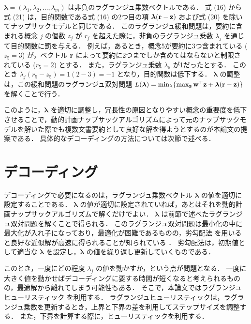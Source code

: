 \documentclass[japanese]{jnlp_1.4}
\begin{document}
$ \boldsymbol{\lambda} = (\lambda_{1}, \lambda_{2}, \ldots, \lambda_{m}) $ は非負のラグランジュ乗数ベクトルである．
式 (16) から式 (21) は，目的関数である式 (16) の2つ目の項 $\boldsymbol{\lambda}({\bf r} - {\bf z}) $ および式 (20) を除いてナップサックモデルと同じである．
このラグランジュ緩和問題は，要約に含まれる概念 $j$ の個数 $z_{j}$ が $r_{j}$ を超えた際に，非負のラグランジュ乗数 $ \lambda_{j} $ を通じて目的関数に罰を与える．
例えば，あるとき，概念5が要約に3つ含まれている ($z_{5} = 3$) が，ベクトル $ {\bf r} $ によって要約に2つまでしか含めてはならないと制限されている ($ r_{5} = 2 $) とする．
また，ラグランジュ乗数 $ \lambda_{5} $ が1だったとする．
このとき $ \lambda_{j} (r_{5} - z_{5}) = 1 (2 - 3) = -1 $ となり，目的関数は低下する．
$ \boldsymbol{\lambda}$ の調整は，この緩和問題のラグランジュ双対問題 $ L(\boldsymbol{\lambda}) = \min_{\lambda} \{\max_{{\bf z}} {\bf w}^{\top} {\bf z} + \boldsymbol{\lambda}({\bf r} - {\bf z})\} $ を解くことで行う．

このように，$\boldsymbol{\lambda}$ を適切に調整し，冗長性の原因となりやすい概念の重要度を低下させることで，動的計画ナップサックアルゴリズムによって元のナップサックモデルを解いた際でも複数文書要約として良好な解を得ようとするのが本論文の提案である．
具体的なデコーディングの方法については次節で述べる．



\section{デコーディング}

デコーディングで必要になるのは，ラグランジュ乗数ベクトル $\boldsymbol{\lambda}$ の値を適切に設定することである．
$\boldsymbol{\lambda}$ の値が適切に設定されていれば，あとはそれを動的計画ナップサックアルゴリズムで解くだけでよい．
$\boldsymbol{\lambda}$ は前節で述べたラグランジュ双対問題を解くことで得られる．
このラグランジュ双対問題は最小化の中に最大化が入れ子になっており，最適化が困難であるものの，劣勾配法 \cite{korte08} を用いると良好な近似解が高速に得られることが知られている \cite{umetani07}．
劣勾配法は，初期値として適当な $\boldsymbol{\lambda}$ を設定し，$\boldsymbol{\lambda}$ の値を繰り返し更新していくものである．

このとき，一度にどの程度 $ \lambda_{j} $ の値を動かすか，という点が問題となる．
一度に大きく値を動かせばデコーディングに要する時間が短くなると考えられるものの，最適解から離れてしまう可能性もある．
そこで，本論文ではラグランジュヒューリスティック \cite{haddadi97} を利用する．
ラグランジュヒューリスティックは，ラグランジュ乗数を更新するとき，上界と下界の差を利用してステップサイズを調整する．
また，下界を計算する際に，ヒューリスティックを利用する．
\end{document}
